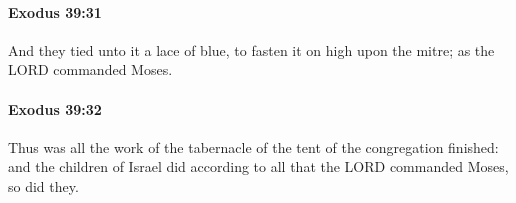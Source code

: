 		\paragraph{Exodus 39:31} %
			\label{EXODUS-39-31}

			And they tied unto it a lace of blue, to fasten it on high upon the mitre; as the LORD commanded Moses.


		\paragraph{Exodus 39:32} %
			\label{EXODUS-39-32}

			Thus was all the work of the tabernacle of the tent of the congregation finished: and the children of Israel did according to all that the LORD commanded Moses, so did they.


